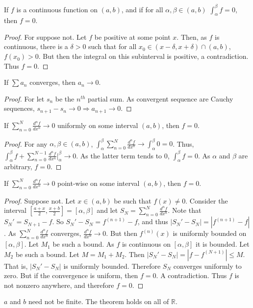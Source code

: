 \documentclass[crop=false,class=book,oneside]{standalone}
\begin{document}
            \begin{theorem}
            If $f$ is a continuous function on $(a,b)$, and if for all $\alpha,\beta\in (a,b)$ $\int_{\alpha}^{\beta}f = 0$, then $f=0$.
            \end{theorem}
            \begin{proof}
            For suppose not. Let $f$ be positive at some point $x$. Then, as $f$ is continuous, there is a $\delta>0$ such that for all $x_0\in (x-\delta,x+\delta)\cap(a,b)$, $f(x_0)>0$. But then the integral on this subinterval is positive, a contradiction. Thus $f=0$.
            \end{proof}
            \begin{theorem}
            If $\sum a_n$ converges, then $a_n \rightarrow 0$.
            \end{theorem}
            \begin{proof}
            For let $s_n$ be the $n^{th}$ partial sum. As convergent sequence are Cauchy sequences, $s_{n+1}-s_n \rightarrow 0\Rightarrow a_{n+1}\rightarrow 0$.
            \end{proof}
            \begin{theorem}
            If $\sum_{n=0}^{N} \frac{d^{n}f}{dx^n} \rightarrow 0$ uniformly on some interval $(a,b)$, then $f=0$.
            \end{theorem}
            \begin{proof}
            For any $\alpha, \beta\in (a,b)$, $\int_{\alpha}^{\beta} \sum_{n=0}^{N} \frac{d^{n}f}{dx^n} \rightarrow \int_{\alpha}^{\beta} 0 = 0$. Thus, $\int_{\alpha}^{\beta} f + \sum_{n=0}^{N-1} \frac{d^n f}{dx^n}\bigg|_{\alpha}^{\beta} \rightarrow 0$. As the latter term tends to $0$, $\int_{\alpha}^{\beta} f = 0$. As $\alpha$ and $\beta$ are arbitrary, $f=0$.
            \end{proof}
            \begin{theorem}
            If $\sum_{n=0}^{N} \frac{d^n f}{dx^n} \rightarrow 0$ point-wise on some interval $(a,b)$, then $f=0$.
            \end{theorem}
            \begin{proof}
            Suppose not. Let $x\in (a,b)$ be such that $f(x)\ne 0$. Consider the interval $[\frac{a+x}{2},\frac{x+b}{2}]=[\alpha,\beta]$ and let $S_N =\sum_{n=0}^{N} \frac{d^n f}{dx^n}$. Note that $S_N' = S_{N+1}-f$. So $S_N' - S_N = f^{(n+1)}-f$, and thus $|S_N'-S_N| = |f^{(n+1)}-f|$. As $\sum_{n=0}^{N} \frac{d^n f}{dx^n}$ converges, $\frac{d^n f}{dx^n} \rightarrow 0$. But then $f^{(n)}(x)$ is uniformly bounded on $[\alpha,\beta]$. Let $M_1$ be such a bound. As $f$ is continuous on $[\alpha,\beta]$ it is bounded. Let $M_2$ be such a bound. Let $M=M_1+M_2$. Then $|S_N'-S_N| = |f-f^{(N+1)}|\leq M$. That is, $|S_N'-S_N|$ is uniformly bounded. Therefore $S_N$ converges uniformly to zero. But if the convergence is uniform, then $f=0$. A contradiction. Thus $f$ is not nonzero anywhere, and therefore $f=0$.
            \end{proof}
            \begin{remark}
            $a$ and $b$ need not be finite. The theorem holds on all of $\mathbb{R}$. 
            \end{remark}
\end{document}
